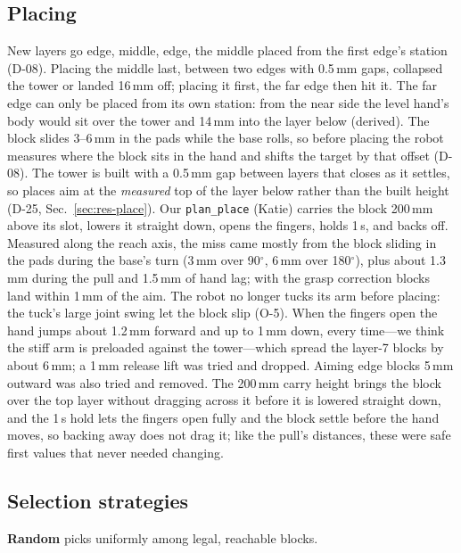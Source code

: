 \documentclass[conference]{IEEEtran}
\begin{document}
\subsection{Placing}
New layers go edge, middle, edge, the middle placed from the first edge's station (D-08). Placing the middle last,
between two edges with 0.5\,mm gaps, collapsed the tower or landed 16\,mm off; placing it first, the far edge then hit
it. The far edge can only be placed from its own station: from the near side the level hand's body would sit over the
tower and 14\,mm into the layer below (derived). The block slides 3--6\,mm in
the pads while the base rolls, so before placing the robot measures where the block sits in the hand and shifts the
target by that offset (D-08). The tower is built with a 0.5\,mm gap between layers that closes as it settles, so places
aim at the \emph{measured} top of the layer below rather than the built height (D-25, Sec.~\ref{sec:res-place}).
Our \texttt{plan\_place} (Katie) carries the block 200\,mm above its slot, lowers it straight down, opens the
fingers, holds 1\,s, and backs off. Measured along the reach axis, the miss came mostly from the block sliding in the
pads during the base's turn (3\,mm over 90$^\circ$, 6\,mm over 180$^\circ$), plus about 1.3\,mm during the pull and 1.5\,mm of
hand lag; with the grasp correction blocks land within 1\,mm of the aim. The robot no longer tucks its arm before
placing: the tuck's large joint swing let the block slip (O-5). When the fingers open the hand jumps about 1.2\,mm
forward and up to 1\,mm down, every time---we think the stiff arm is preloaded against the tower---which spread the
layer-7 blocks by about 6\,mm; a 1\,mm release lift was tried and dropped. Aiming edge blocks 5\,mm outward was also tried
and removed. The 200\,mm carry height brings the block over the top layer without dragging across it before it
is lowered straight down, and the 1\,s hold lets the fingers open fully and the block settle before the hand moves, so
backing away does not drag it; like the pull's distances, these were safe first values that never needed changing.

\subsection{Selection strategies}
\textbf{Random} picks uniformly among legal, reachable blocks.
\end{document}
